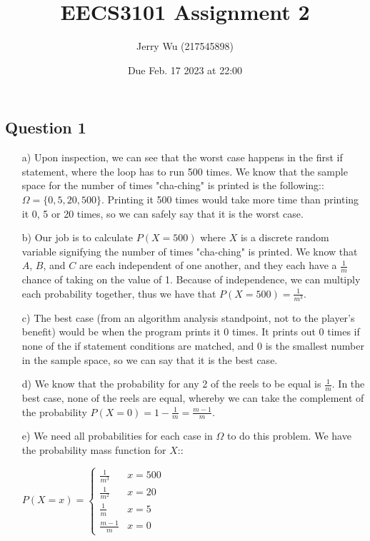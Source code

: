 \documentclass[12pt]{article}
\title{EECS3101 Assignment 2}
\author{Jerry Wu (217545898)}
\date{Due Feb. 17 2023 at 22:00}
\begin{document}
\maketitle

\subsection*{Question 1}

\begin{itemize}
    \item[a)] Upon inspection, we can see that the worst case happens in the first if statement, where the loop has to run 500 times. We know that the sample space for the number of times "cha-ching" is printed is the following:: $\Omega=\{0,5,20,500\}$. Printing it 500 times would take more time than printing it 0, 5 or 20 times, so we can safely say that it is the worst case.
    
    \item[b)] Our job is to calculate $P(X=500)$ where $X$ is a discrete random variable signifying the number of times "cha-ching" is printed. We know that $A$, $B$, and $C$ are each independent of one another, and they each have a $\frac{1}{m}$ chance of taking on the value of 1. Because of independence, we can multiply each probability together, thus we have that $P(X=500)=\frac{1}{m^3}$.
    \item[c)] The best case (from an algorithm analysis standpoint, not to the player's benefit) would be when the program prints it 0 times. It prints out 0 times if none of the if statement conditions are matched, and 0 is the smallest number in the sample space, so we can say that it is the best case.
    \item[d)] We know that the probability for any 2 of the reels to be equal is $\frac{1}{m}$. In the best case, none of the reels are equal, whereby we can take the complement of the probability $P(X=0)=1-\frac{1}{m}=\frac{m-1}{m}$.
    \item[e)] We need all probabilities for each case in $\Omega$ to do this problem. We have the probability mass function for $X$::
    

    $P(X=x)=\begin{cases}
        \frac{1}{m^3} & x=500 \\
        \frac{1}{m^2} & x=20 \\
        \frac{1}{m} &x=5\\
        \frac{m-1}{m} & x=0 
    \end{cases}$


\end{itemize}
\end{document}

